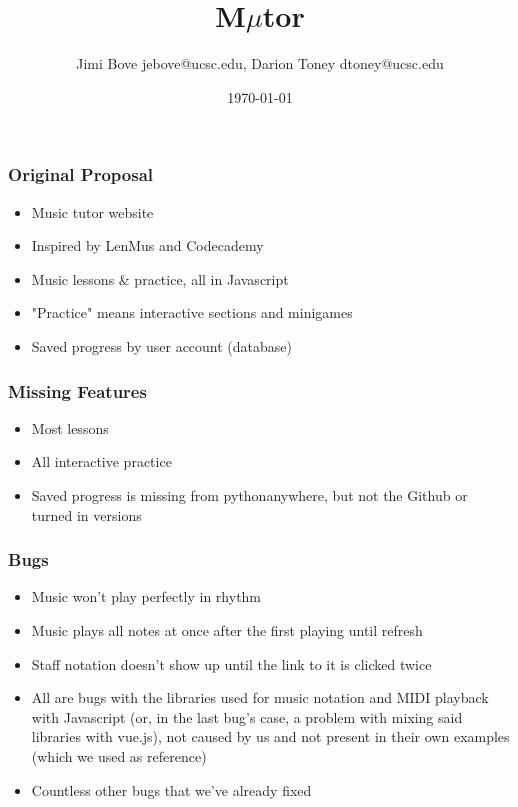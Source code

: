 \documentclass[24pt]{beamer}
\title{M$\mu$tor}
\author{Jimi Bove jebove@ucsc.edu, Darion Toney dtoney@ucsc.edu}
\date{\today}
\begin{document}
\maketitle

\begin{frame}
\frametitle{Original Proposal}
\begin{itemize}
  \item Music tutor website
  \item Inspired by LenMus and Codecademy
  \item Music lessons \& practice, all in Javascript
  \item "Practice" means interactive sections and minigames
  \item Saved progress by user account (database)
\end{itemize}
\end{frame}

\begin{frame}
\frametitle{Missing Features}
\begin{itemize}
  \item Most lessons
  \item All interactive practice
  \item Saved progress is missing from pythonanywhere, but not the Github or turned in versions
\end{itemize}
\end{frame}

\begin{frame}
\frametitle{Bugs}
\begin{itemize}
  \item Music won't play perfectly in rhythm
  \item Music plays all notes at once after the first playing until refresh
  \item Staff notation doesn't show up until the link to it is clicked twice
  \item All are bugs with the libraries used for music notation and MIDI playback with Javascript (or, in the last bug's case, a problem with mixing said libraries with vue.js), not caused by us and not present in their own examples (which we used as reference)
  \item Countless other bugs that we've already fixed
\end{itemize}
\end{frame}
\end{document}
